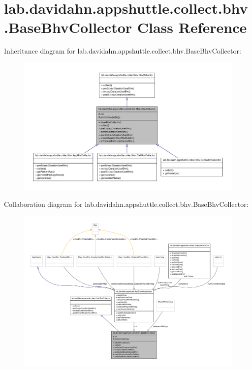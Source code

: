 \hypertarget{classlab_1_1davidahn_1_1appshuttle_1_1collect_1_1bhv_1_1_base_bhv_collector}{\section{lab.\-davidahn.\-appshuttle.\-collect.\-bhv.\-Base\-Bhv\-Collector \-Class \-Reference}
\label{classlab_1_1davidahn_1_1appshuttle_1_1collect_1_1bhv_1_1_base_bhv_collector}
}


\-Inheritance diagram for lab.\-davidahn.\-appshuttle.\-collect.\-bhv.\-Base\-Bhv\-Collector\-:
\nopagebreak
\begin{figure}[H]
\begin{center}
\leavevmode
\includegraphics[width=350pt]{classlab_1_1davidahn_1_1appshuttle_1_1collect_1_1bhv_1_1_base_bhv_collector__inherit__graph}
\end{center}
\end{figure}


\-Collaboration diagram for lab.\-davidahn.\-appshuttle.\-collect.\-bhv.\-Base\-Bhv\-Collector\-:
\nopagebreak
\begin{figure}[H]
\begin{center}
\leavevmode
\includegraphics[width=350pt]{classlab_1_1davidahn_1_1appshuttle_1_1collect_1_1bhv_1_1_base_bhv_collector__coll__graph}
\end{center}
\end{figure}

